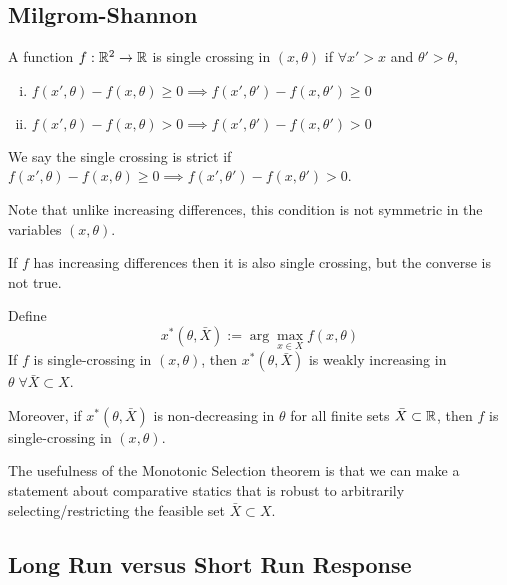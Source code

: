 \subsection{Milgrom-Shannon}
\label{sec:milgrom-shannon}

\begin{definition}
  A function $f: {\mathbb R}^2 \to {\mathbb R}$ is single crossing in $(x, \theta)$ if
  $\forall x' > x$ and $\theta' > \theta$,
  \begin{enumerate}[(i)]
  \item $f(x', \theta) - f(x, \theta) \geq 0 \implies f(x', \theta') -
    f(x, \theta') \geq 0$
  \item $f(x', \theta) - f(x, \theta) > 0 \implies f(x', \theta') -
    f(x, \theta') > 0$
  \end{enumerate}

  We say the single crossing is strict if $f(x', \theta) - f(x,
  \theta) \geq 0 \implies f(x', \theta') - f(x, \theta') > 0$.
\end{definition}

Note that unlike increasing differences, this condition is not
symmetric in the variables $(x, \theta)$.

\begin{prop}
  If $f$ has increasing differences then it is also single crossing,
  but the converse is not true.
\end{prop}

\begin{prop}
  Define
  \[
  x^*(\theta, \bar X) := \arg \max_{x \in X} f(x, \theta)
  \]
  If $f$ is single-crossing in $(x, \theta)$, then $x^*(\theta, \bar
  X)$ is weakly increasing in $\theta \; \forall \bar X \subset X$.

  Moreover, if $x^*(\theta, \bar X)$ is non-decreasing in $\theta$ for
  all finite sets $\bar X \subset {\mathbb R}$, then $f$ is single-crossing in
  $(x, \theta)$.
\end{prop}

The usefulness of the Monotonic Selection theorem is that we can make
a statement about comparative statics that is robust to arbitrarily
selecting/restricting the feasible set $\bar X \subset X$.

\subsection{Long Run versus Short Run Response}
\label{sec:LR-SR}


